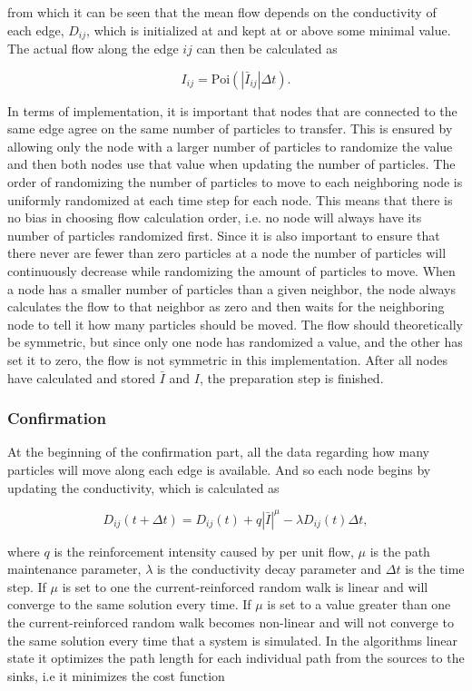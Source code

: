  \noindent from which it can be seen that the mean flow depends on the conductivity of each edge, $D_{ij}$, which is 	initialized at and kept at or above some minimal value. The actual flow along the edge $ij$ can then be calculated as

\begin{equation}
I_{ij} = \text{Poi}(|\bar{I}_{ij}|\Delta t).
\end{equation}

In terms of implementation, it is important that nodes that are connected to the same edge agree on the same number of particles to transfer. This is ensured by allowing only the node with a larger number of particles to randomize the value and then both nodes use that value when updating the number of particles. The order of randomizing the number of particles to move to each neighboring node is uniformly randomized at each time step for each node. This means that there is no bias in choosing flow calculation order, i.e. no node will always have its number of particles randomized first. Since it is also important to ensure that there never are fewer than zero particles at a node the number of particles will continuously decrease while randomizing the amount of particles to move. When a node has a smaller number of particles than a given neighbor, the node always calculates the flow to that neighbor as zero and then waits for the neighboring node to tell it how many particles should be moved. The flow should theoretically be symmetric, but since only one node has randomized a value, and the other has set it to zero, the flow is not symmetric in this implementation. After all nodes have calculated and stored $\bar{I}$ and $I$, the preparation step is finished.

\subsubsection{Confirmation}
\label{sec:confirmation}
At the beginning of the confirmation part, all the data regarding how many particles will move along each edge is available. And so each node begins by updating the conductivity, which is calculated as

\begin{equation}
D_{ij}(t + \Delta t) = D_{ij}(t) + q|\bar{I}|^\mu - \lambda D_{ij}(t)\Delta t,
\end{equation}

 \noindent where $q$ is the reinforcement intensity caused by per unit flow, $\mu$ is the path maintenance parameter, $\lambda$ is the conductivity decay parameter and $\Delta t$ is the time step. If $\mu$ is set to one the current-reinforced random walk is linear and will converge to the same solution every time. If $\mu$ is set to a value greater than one the current-reinforced random walk becomes non-linear and will not converge to the same solution every time that a system is simulated. In the algorithms linear state it optimizes the path length for each individual path from the sources to the sinks, i.e it minimizes the cost function

